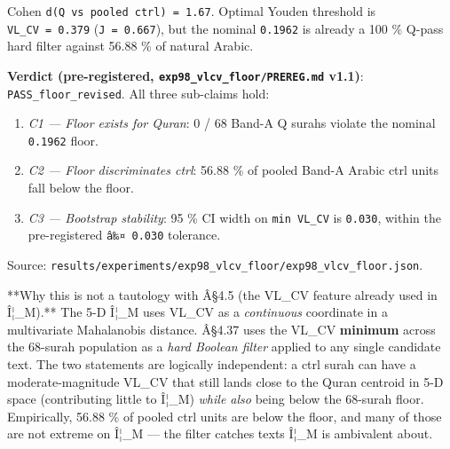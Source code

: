 \documentclass[
]{article}
\providecommand{\tightlist}{%
  \setlength{\itemsep}{0pt}\setlength{\parskip}{0pt}}
\begin{document}
Cohen \texttt{d(Q\ vs\ pooled\ ctrl)\ =\ 1.67}. Optimal Youden threshold
is \texttt{VL\_CV\ =\ 0.379} (\texttt{J\ =\ 0.667}), but the nominal
\texttt{0.1962} is already a 100 \% Q-pass hard filter against 56.88 \%
of natural Arabic.

\textbf{Verdict (pre-registered, \texttt{exp98\_vlcv\_floor/PREREG.md}
v1.1)}: \texttt{PASS\_floor\_revised}. All three sub-claims hold:

\begin{enumerate}
\def\labelenumi{\arabic{enumi}.}
\tightlist
\item
  \emph{C1 --- Floor exists for Quran}: 0 / 68 Band-A Q surahs violate
  the nominal \texttt{0.1962} floor.
\item
  \emph{C2 --- Floor discriminates ctrl}: 56.88 \% of pooled Band-A
  Arabic ctrl units fall below the floor.
\item
  \emph{C3 --- Bootstrap stability}: 95 \% CI width on
  \texttt{min\ VL\_CV} is \texttt{0.030}, within the pre-registered
  \texttt{â‰¤\ 0.030} tolerance.
\end{enumerate}

Source:
\texttt{results/experiments/exp98\_vlcv\_floor/exp98\_vlcv\_floor.json}.

**Why this is not a tautology with Â§4.5 (the VL\_CV feature already
used in Î¦\_M).** The 5-D Î¦\_M uses VL\_CV as a \emph{continuous}
coordinate in a multivariate Mahalanobis distance. Â§4.37 uses the
VL\_CV \textbf{minimum} across the 68-surah population as a \emph{hard
Boolean filter} applied to any single candidate text. The two statements
are logically independent: a ctrl surah can have a moderate-magnitude
VL\_CV that still lands close to the Quran centroid in 5-D space
(contributing little to Î¦\_M) \emph{while also} being below the
68-surah floor. Empirically, 56.88 \% of pooled ctrl units are below the
floor, and many of those are not extreme on Î¦\_M --- the filter catches
texts Î¦\_M is ambivalent about.
\end{document}
